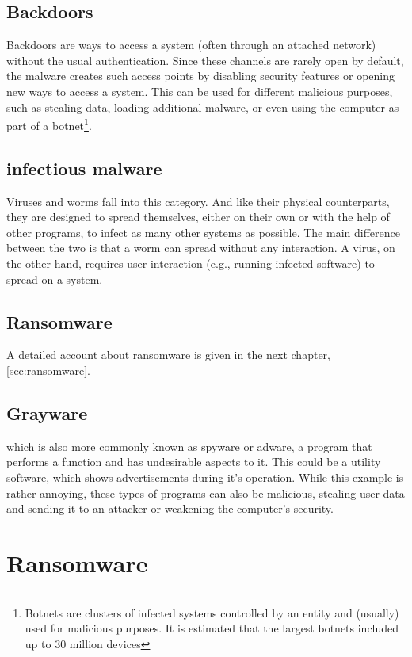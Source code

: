 \section{Backdoors}

Backdoors are ways to access a system (often through an attached network) without the usual authentication.
Since these channels are rarely open by default, the malware creates such access points by disabling security features or opening new ways to access a system.
This can be used for different malicious purposes, such as stealing data, loading additional malware, or even using the computer as part of a botnet\footnote{Botnets are clusters of infected systems controlled by an entity and (usually) used for malicious purposes. It is estimated that the largest botnets included up to 30 million devices}.

\section{infectious malware}

Viruses and worms fall into this category.
And like their physical counterparts, they are designed to spread themselves, either on their own or with the help of other programs, to infect as many other systems as possible.
The main difference between the two is that a worm can spread without any interaction. A virus, on the other hand, requires user interaction (e.g., running infected software) to spread on a system.

\section{Ransomware}

A detailed account about ransomware is given in the next chapter, \autoref{sec:ransomware}.

\section{Grayware}

which is also more commonly known as spyware or adware, a program that performs a function and has undesirable aspects to it.
This could be a utility software, which shows advertisements during it's operation.
While this example is rather annoying, these types of programs can also be malicious, stealing user data and sending it to an attacker or weakening the computer's security.

\chapter{Ransomware}
\label{sec:ransomware}
